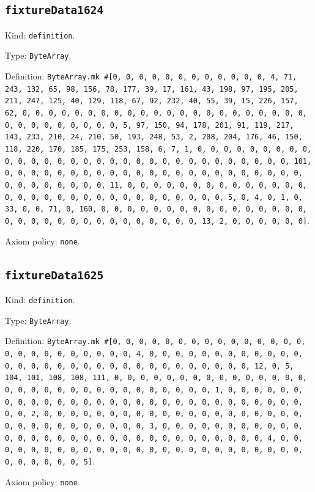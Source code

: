 \documentclass[11pt]{article}
\begin{document}
\subsection*{\texttt{fixtureData1624}}
\noindent Kind: \texttt{definition}.\par
\noindent Type: \texttt{ByteArray}.\par
\noindent Definition: \texttt{ByteArray.mk \#[0, 0, 0, 0, 0, 0, 0, 0, 0, 0, 0, 0, 4, 71, 243, 132, 65, 98, 156, 78, 177, 39, 17, 161, 43, 198, 97, 195, 205, 211, 247, 125, 40, 129, 118, 67, 92, 232, 40, 55, 39, 15, 226, 157, 62, 0, 0, 0, 0, 0, 0, 0, 0, 0, 0, 0, 0, 0, 0, 0, 0, 0, 0, 0, 0, 0, 0, 0, 0, 0, 0, 0, 0, 0, 0, 0, 5, 97, 150, 94, 178, 201, 91, 119, 217, 143, 233, 210, 24, 210, 50, 193, 248, 53, 2, 208, 204, 176, 46, 150, 118, 220, 170, 185, 175, 253, 158, 6, 7, 1, 0, 0, 0, 0, 0, 0, 0, 0, 0, 0, 0, 0, 0, 0, 0, 0, 0, 0, 0, 0, 0, 0, 0, 0, 0, 0, 0, 0, 0, 0, 0, 101, 0, 0, 0, 0, 0, 0, 0, 0, 0, 0, 0, 0, 0, 0, 0, 0, 0, 0, 0, 0, 0, 0, 0, 0, 0, 0, 0, 0, 0, 0, 0, 11, 0, 0, 0, 0, 0, 0, 0, 0, 0, 0, 0, 0, 0, 0, 0, 0, 0, 0, 0, 0, 0, 0, 0, 0, 0, 0, 0, 0, 0, 0, 0, 5, 0, 4, 0, 1, 0, 33, 0, 0, 71, 0, 160, 0, 0, 0, 0, 0, 0, 0, 0, 0, 0, 0, 0, 0, 0, 0, 0, 0, 0, 0, 0, 0, 0, 0, 0, 0, 0, 0, 0, 0, 0, 0, 13, 2, 0, 0, 0, 0, 0, 0]}.\par
\noindent Axiom policy: \texttt{none}.\par
\subsection*{\texttt{fixtureData1625}}
\noindent Kind: \texttt{definition}.\par
\noindent Type: \texttt{ByteArray}.\par
\noindent Definition: \texttt{ByteArray.mk \#[0, 0, 0, 0, 0, 0, 0, 0, 0, 0, 0, 0, 0, 0, 0, 0, 0, 0, 0, 0, 0, 0, 0, 0, 0, 4, 0, 0, 0, 0, 0, 0, 0, 0, 0, 0, 0, 0, 0, 0, 0, 0, 0, 0, 0, 0, 0, 0, 0, 0, 0, 0, 0, 0, 0, 0, 0, 12, 0, 5, 104, 101, 108, 108, 111, 0, 0, 0, 0, 0, 0, 0, 0, 0, 0, 0, 0, 0, 0, 0, 0, 0, 0, 0, 0, 0, 0, 0, 0, 0, 0, 0, 0, 0, 0, 0, 1, 0, 0, 0, 0, 0, 0, 0, 0, 0, 0, 0, 0, 0, 0, 0, 0, 0, 0, 0, 0, 0, 0, 0, 0, 0, 0, 0, 0, 0, 0, 0, 2, 0, 0, 0, 0, 0, 0, 0, 0, 0, 0, 0, 0, 0, 0, 0, 0, 0, 0, 0, 0, 0, 0, 0, 0, 0, 0, 0, 0, 0, 0, 0, 3, 0, 0, 0, 0, 0, 0, 0, 0, 0, 0, 0, 0, 0, 0, 0, 0, 0, 0, 0, 0, 0, 0, 0, 0, 0, 0, 0, 0, 0, 0, 0, 4, 0, 0, 0, 0, 0, 0, 0, 0, 0, 0, 0, 0, 0, 0, 0, 0, 0, 0, 0, 0, 0, 0, 0, 0, 0, 0, 0, 0, 0, 0, 0, 5]}.\par
\noindent Axiom policy: \texttt{none}.\par
\end{document}
